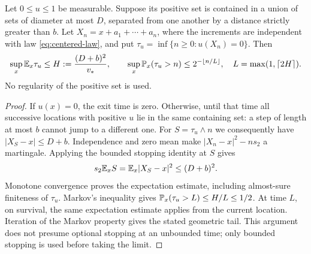 \begin{lemma}\label{lem:mean-exit}
Let $0\le u\le1$ be measurable. Suppose its positive set is contained
in a union of sets of diameter at most $D$, separated from one another
by a distance strictly greater than $b$. Let $X_n=x+a_1+\cdots+a_n$,
where the increments are independent with law \eqref{eq:centered-law},
and put $\tau_u=\inf\{n\ge0:u(X_n)=0\}$. Then
\begin{equation}\label{eq:exit-bound}
 \sup_x\mathbb E_x\tau_u\le H:=\frac{(D+b)^2}{v_*},\qquad
 \sup_x\mathbb P_x(\tau_u>n)\le2^{-\lfloor n/L\rfloor},
 \quad L=\max(1,\lceil2H\rceil).
\end{equation}
No regularity of the positive set is used.
\end{lemma}
\begin{proof}
If $u(x)=0$, the exit time is zero. Otherwise, until that time all
successive locations with positive $u$ lie in the same containing set:
a step of length at most $b$ cannot jump to a different one. For
$S=\tau_u\wedge n$ we consequently have $|X_S-x|\le D+b$.
Independence and zero mean make
$|X_n-x|^2-ns_2$ a martingale. Applying the bounded stopping identity
at $S$ gives
\[
 s_2\mathbb E_x S=\mathbb E_x|X_S-x|^2\le(D+b)^2.
\]
Monotone convergence proves the expectation estimate, including
almost-sure finiteness of $\tau_u$. Markov's inequality gives
$\mathbb P_x(\tau_u>L)\le H/L\le1/2$. At time $L$, on survival,
the same expectation estimate applies from the current location.
Iteration of the Markov property gives the stated geometric tail.
This argument does not presume optional stopping at an unbounded time;
only bounded stopping is used before taking the limit.
\end{proof}


